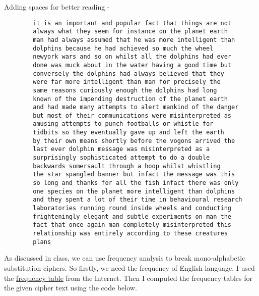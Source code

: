 \documentclass{article}
\begin{document}
    Adding spaces for better reading - 
    \begin{verbatim}
        it is an important and popular fact that things are not 
        always what they seem for instance on the planet earth 
        man had always assumed that he was more intelligent than
        dolphins because he had achieved so much the wheel 
        newyork wars and so on whilst all the dolphins had ever
        done was muck about in the water having a good time but
        conversely the dolphins had always believed that they
        were far more intelligent than man for precisely the 
        same reasons curiously enough the dolphins had long 
        known of the impending destruction of the planet earth 
        and had made many attempts to alert mankind of the danger 
        but most of their communications were misinterpreted as 
        amusing attempts to punch footballs or whistle for 
        tidbits so they eventually gave up and left the earth 
        by their own means shortly before the vogons arrived the 
        last ever dolphin message was misinterpreted as a 
        surprisingly sophisticated attempt to do a double 
        backwards somersault through a hoop whilst whistling 
        the star spangled banner but infact the message was this 
        so long and thanks for all the fish infact there was only 
        one species on the planet more intelligent than dolphins 
        and they spent a lot of their time in behavioural research 
        laboratories running round inside wheels and conducting 
        frighteningly elegant and subtle experiments on man the 
        fact that once again man completely misinterpreted this 
        relationship was entirely according to these creatures 
        plans
    \end{verbatim}

    As discussed in class, we can use frequency analysis to break mono-alphabetic substitution ciphers. So firstly, we need the frequency of English language. I used the \href{https://www3.nd.edu/~busiforc/handouts/cryptography/Letter%20Frequencies.html#Results_from_Project_Gutenberg}{frequency table} from the Internet. Then I computed the frequency tables for the given cipher text using the code below.
\end{document}
